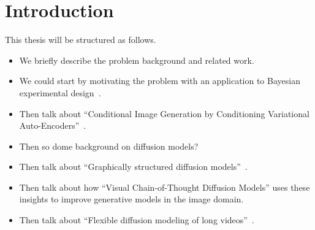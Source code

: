 \chapter{Introduction}
\label{ch:introduction}


This thesis will be structured as follows.
\begin{itemize}
    \item We briefly describe the problem background and related work.
    \item We could start by motivating the problem with an application to Bayesian experimental design~\citep{harvey2022near}.
    \item Then talk about ``Conditional Image Generation by Conditioning Variational Auto-Encoders''~\citep{harvey2021conditional}.
    \item Then so dome background on diffusion models?
    \item Then talk about ``Graphically structured diffusion models''~\citep{weilbach2023graphically}.
    \item Then talk about how ``Visual Chain-of-Thought Diffusion Models''\citep{harvey2023visual} uses these insights to improve generative models in the image domain.
    \item Then talk about ``Flexible diffusion modeling of long videos''~\citep{harvey2022flexible}.
\end{itemize}

\endinput

Any text after an \endinput is ignored.
You could put scraps here or things in progress.
